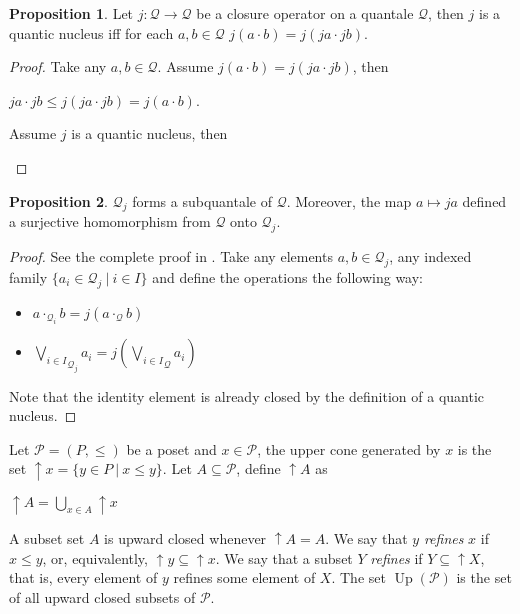 \documentclass[8pt]{article}
\theoremstyle{definition}
\theoremstyle{definition}
\theoremstyle{definition}
\theoremstyle{definition}
\theoremstyle{definition}
\theoremstyle{definition}
\theoremstyle{definition}
\newtheorem{prop}{Proposition}[section]
\theoremstyle{definition}
\theoremstyle{definition}
\theoremstyle{definition}
\theoremstyle{definition}
\theoremstyle{definition}
\theoremstyle{definition}
\theoremstyle{question}
\begin{document}
\begin{prop} Let $j : \mathcal{Q} \to \mathcal{Q}$ be a closure operator on a 
  quantale $\mathcal{Q}$, then $j$ is a quantic nucleus iff
  for each $a, b \in \mathcal{Q}$ $j(a \cdot b) = j (j a \cdot j b)$.
\end{prop}

\begin{proof} Take any $a, b \in \mathcal{Q}$.
  Assume $j(a \cdot b) = j (j a \cdot j b)$,
  then 
  \begin{center}
  $ja \cdot jb \leq j (j a \cdot j b) = j (a \cdot b)$.
  \end{center}

  Assume $j$ is a quantic nucleus, then
  \begin{prooftree}
  \end{prooftree}
\end{proof}


\begin{prop}
  $\mathcal{Q}_j$ forms a subquantale of $\mathcal{Q}$. Moreover, the map $a \mapsto j a$
  defined a surjective homomorphism from $\mathcal{Q}$ onto $\mathcal{Q}_j$.
\end{prop}

\begin{proof} See the complete proof in \cite[Theorem 3.1.1]{570645}.
Take any elements $a, b \in \mathcal{Q}_j$, any indexed family $\{ a_i \in \mathcal{Q}_j \: | \: i \in I \}$
and define the operations the following way:
\begin{itemize}
  \item $a \cdot_{\mathcal{Q}_i} b = j(a \cdot_{\mathcal{Q}} b)$
  \item ${\bigvee \limits_{i \in I}}_{\mathcal{Q}_j} a_i = j ({\bigvee \limits_{i \in I}}_{\mathcal{Q}} a_i)$
\end{itemize}
Note that the identity element is already closed by the definition of a quantic nucleus.
\end{proof}

Let $\mathcal{P} = (P, \leq)$ be a poset and $x \in \mathcal{P}$, the upper cone generated by $x$ is the set $\uparrow x = \{ y \in P \: | \: x \leq y \}$. 
Let $A \subseteq \mathcal{P}$, define $\uparrow A$ as
\begin{center}
$\uparrow A = \bigcup \limits_{x \in A} \uparrow x$
\end{center}
A subset set $A$ is upward closed whenever $\uparrow A = A$.
We say that $y$ \emph{refines} $x$ if $x \leq y$, or, equivalently, 
$\uparrow y \subseteq \uparrow x$. We say that a subset $Y$ \emph{refines} 
if $Y \subseteq \uparrow X$, that is, every element of $y$ refines some element of $X$.
The set $\operatorname{Up}(\mathcal{P})$ is the set of all upward closed subsets of $\mathcal{P}$.
\end{document}
